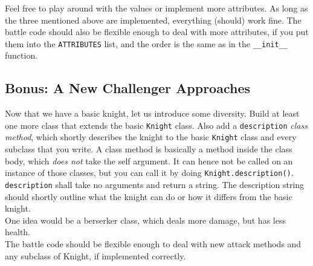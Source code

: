 \indent Feel free to play around with the values or implement more attributes. As long as
the three mentioned above are implemented, everything (should) work fine. The battle
code should also be flexible enough to deal with more attributes, if you put them
into the \texttt{ATTRIBUTES} list, and the order is the same as in the \texttt{\_\_init\_\_}
function.

\subsection{Bonus: A New Challenger Approaches}
Now that we have a basic knight, let us introduce some diversity.
Build at least one more class that extends the basic \texttt{Knight} class.
Also add a \texttt{description} \textit{class method}, which shortly describes
the knight to the basic \texttt{Knight} class and every subclass that you write.
A class method is basically a method inside the class body, which \textit{does not}
take the self argument. It can hence not be called on an instance of those classes,
but you can call it by doing \texttt{Knight.description()}. \texttt{description}
shall take no arguments and return a string. The description string should shortly
outline what the knight can do or how it differs from the basic knight.\\
One idea would be a berserker class, which deals more damage, but has less health.\\

\noindent The battle code should be flexible enough to deal with new attack methods and any
subclass of Knight, if implemented correctly.

